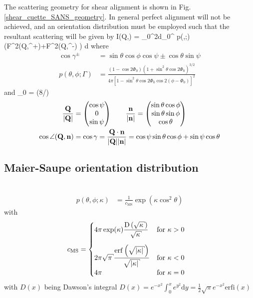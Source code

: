 The scattering geometry for shear alignment is shown in Fig.
\ref{shear_cuette_SANS_geometry}. In general perfect alignment
will not be achieved, and an orientation distribution must be
employed such that the resultant scattering will be given by
\BE
I(Q,\psi) = \int_0^{2\pi}d\varPhi \int_0^\pi
p(\theta,\varPhi;\Gamma)\, \left(F^2(Q,\gamma^+)+F^2(Q,\gamma^-)
\right) \sin\theta d\theta
\EE
where
\begin{align}
\cos\gamma^\pm & = \sin\theta\cos\phi\cos\psi\pm\cos\theta\sin\psi \\[3mm]
p(\theta,\phi;\Gamma) & = \frac{(1-\cos
2\varPhi_0)(1+\sin^2\theta\cos 2\varPhi_0)^{3/2}}{4\pi\left[
1-\sin^2\theta\cos 2\varPhi_0\cos 2(\phi-\varPhi_0)\right]^2}
\end{align}
and
\varPhi_0 = \arctan(8/\Gamma)
\EE
\begin{align}
\frac{\mathbf{Q}}{\abs{\mathbf{Q}}} &=
\begin{pmatrix}
\cos \psi \\
0  \\
\sin \psi
\end{pmatrix} \qquad
\frac{\mathbf{n}}{\abs{\mathbf{n}}} =
\begin{pmatrix}
\sin \theta \cos \phi \\
\sin \theta \sin \phi  \\
\cos \theta
\end{pmatrix} \\
\cos \angle(\mathbf{Q,n}) &= \cos \gamma = \frac{\mathbf{Q\cdot n}}{\abs{\mathbf{Q}}\abs{\mathbf{n}}} =  \cos\psi \sin\theta \cos\phi + \sin\psi \cos\theta
\end{align}


\newpage
\subsection{Maier-Saupe orientation distribution} ~\\

\begin{align}
p(\theta,\phi;\kappa) & = \frac{1}{c_\mathrm{MS}}\exp\left(\kappa \cos^2\theta\right) 
\end{align}
with
\begin{align}
c_\mathrm{MS} &=
\begin{cases} 
\displaystyle
4\pi\exp(\kappa) \frac{\mathrm{D}\left(\sqrt{\kappa}\right)}{\sqrt{\kappa}}   &\mathrm{for~} \kappa > 0 \\[5mm]
\displaystyle
2\pi \sqrt{\pi} \frac{\mathrm{erf}\left(\sqrt{\abs{\kappa}}\right)}{\sqrt{\abs{\kappa}}}  &\mathrm{for~} \kappa < 0 \\[2mm]
\displaystyle
4\pi                                                                                      &\mathrm{for~} \kappa = 0
\end{cases}
\end{align}
with $D(x)$ being Dawson's integral $D(x)=e^{-x^2}\int_0^x e^{y^2} \mathrm{d}y = \frac12\sqrt{\pi}e^{-x^2}\mathrm{erfi}(x)$

